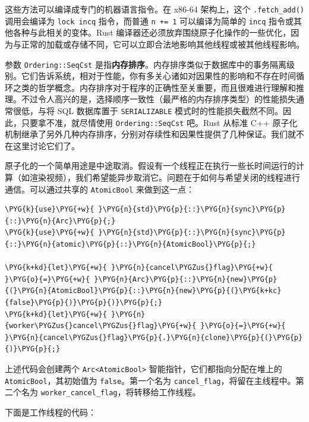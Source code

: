 这些方法可以编译成专门的机器语言指令。在 x86-64 架构上，这个 \texttt{.fetch\_add()} 调用会编译为 \texttt{lock incq} 指令，而普通 \texttt{n += 1} 可以编译为简单的 \texttt{incq} 指令或其他各种与此相关的变体。Rust 编译器还必须放弃围绕原子化操作的一些优化，因为与正常的加载或存储不同，它可以立即合法地影响其他线程或被其他线程影响。

参数 \texttt{Ordering::SeqCst} 是指\textbf{内存排序}。内存排序类似于数据库中的事务隔离级别。它们告诉系统，相对于性能，你有多关心诸如对因果性的影响和不存在时间循环之类的哲学概念。内存排序对于程序的正确性至关重要，而且很难进行理解和推理。不过令人高兴的是，选择顺序一致性（最严格的内存排序类型）的性能损失通常很低，与将 SQL 数据库置于 \texttt{SERIALIZABLE} 模式时的性能损失截然不同。因此，只要拿不准，就尽情使用 \texttt{Ordering::SeqCst} 吧。Rust 从标准 C++ 原子化机制继承了另外几种内存排序，分别对存续性和因果性提供了几种保证。我们就不在这里讨论它们了。

原子化的一个简单用途是中途取消。假设有一个线程正在执行一些长时间运行的计算（如渲染视频），我们希望能异步取消它。问题在于如何与希望关闭的线程进行通信。可以通过共享的 \texttt{AtomicBool} 来做到这一点：

\begin{Verbatim}[commandchars=\\\{\},breaklines=true,breakanywhere=true,fontsize=\codefont,xleftmargin=17bp]
\PYG{k}{use}\PYG{+w}{ }\PYG{n}{std}\PYG{p}{::}\PYG{n}{sync}\PYG{p}{::}\PYG{n}{Arc}\PYG{p}{;}
\PYG{k}{use}\PYG{+w}{ }\PYG{n}{std}\PYG{p}{::}\PYG{n}{sync}\PYG{p}{::}\PYG{n}{atomic}\PYG{p}{::}\PYG{n}{AtomicBool}\PYG{p}{;}

\PYG{k+kd}{let}\PYG{+w}{ }\PYG{n}{cancel\PYGZus{}flag}\PYG{+w}{ }\PYG{o}{=}\PYG{+w}{ }\PYG{n}{Arc}\PYG{p}{::}\PYG{n}{new}\PYG{p}{(}\PYG{n}{AtomicBool}\PYG{p}{::}\PYG{n}{new}\PYG{p}{(}\PYG{k+kc}{false}\PYG{p}{)}\PYG{p}{)}\PYG{p}{;}
\PYG{k+kd}{let}\PYG{+w}{ }\PYG{n}{worker\PYGZus{}cancel\PYGZus{}flag}\PYG{+w}{ }\PYG{o}{=}\PYG{+w}{ }\PYG{n}{cancel\PYGZus{}flag}\PYG{p}{.}\PYG{n}{clone}\PYG{p}{(}\PYG{p}{)}\PYG{p}{;}
\end{Verbatim}

上述代码会创建两个 \texttt{Arc<AtomicBool>} 智能指针，它们都指向分配在堆上的 \texttt{AtomicBool}，其初始值为 \texttt{false}。第一个名为 \texttt{cancel\_flag}，将留在主线程中。第二个名为 \texttt{worker\_cancel\_flag}，将转移给工作线程。

下面是工作线程的代码：

